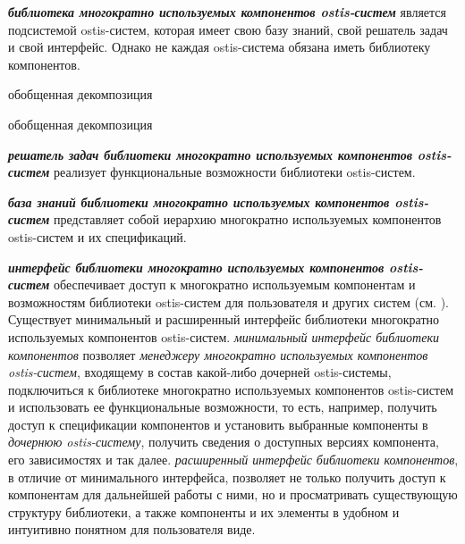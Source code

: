 \textbf{\textit{библиотека многократно используемых компонентов ostis-систем}} является подсистемой ostis-систем, которая имеет свою базу знаний, свой решатель задач и свой интерфейс. Однако не каждая ostis-система обязана иметь библиотеку компонентов.

\begin{SCn}
	\begin{scnrelfromset}{обобщенная декомпозиция}
		\begin{scnindent}
			\begin{scnrelfromset}{обобщенная декомпозиция}
				\begin{scnindent}
				\end{scnindent}
			\end{scnrelfromset}
		\end{scnindent}
	\end{scnrelfromset}
\end{SCn}

\textbf{\textit{решатель задач библиотеки многократно используемых компонентов ostis-систем}} реализует функциональные возможности библиотеки ostis-систем.

\textbf{\textit{база знаний библиотеки многократно используемых компонентов ostis-систем}} представляет собой иерархию многократно используемых компонентов ostis-систем и их спецификаций.

\textbf{\textit{интерфейс библиотеки многократно используемых компонентов ostis-систем}} обеспечивает доступ к многократно используемым компонентам и возможностям библиотеки ostis-систем для пользователя и других систем (см. ). Существует минимальный и расширенный интерфейс библиотеки многократно используемых компонентов ostis-систем. \textit{минимальный интерфейс библиотеки компонентов} позволяет \textit{менеджеру многократно используемых компонентов ostis-систем}, входящему в состав какой-либо дочерней ostis-системы, подключиться к библиотеке многократно используемых компонентов ostis-систем и использовать ее функциональные возможности, то есть, например, получить доступ к спецификации компонентов и установить выбранные компоненты в \textit{дочернюю ostis-систему}, получить сведения о доступных версиях компонента, его зависимостях и так далее. \textit{расширенный интерфейс библиотеки компонентов}, в отличие от минимального интерфейса, позволяет не только получить доступ к компонентам для дальнейшей работы с ними, но и просматривать существующую структуру библиотеки, а также компоненты и их элементы в удобном и интуитивно понятном для пользователя виде.

